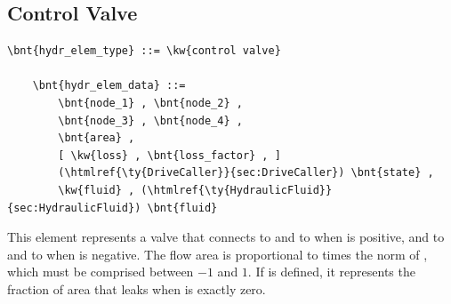 \subsection{Control Valve}
\label{sec:EL:HYDR:CONTROL_VALVE}
\begin{Verbatim}[commandchars=\\\{\}]
    \bnt{hydr_elem_type} ::= \kw{control valve}

    \bnt{hydr_elem_data} ::=
        \bnt{node_1} , \bnt{node_2} ,
        \bnt{node_3} , \bnt{node_4} ,
        \bnt{area} ,
        [ \kw{loss} , \bnt{loss_factor} , ]
        (\htmlref{\ty{DriveCaller}}{sec:DriveCaller}) \bnt{state} ,
        \kw{fluid} , (\htmlref{\ty{HydraulicFluid}}{sec:HydraulicFluid}) \bnt{fluid}
\end{Verbatim}
This element represents a valve that connects
 to  and  to 
when  is positive, and  to 
and  to  when  is negative.
The flow area is proportional to  times the norm of ,
which must be comprised between $-1$ and $1$.
If  is defined, it represents the fraction
of area that leaks when  is exactly zero.



